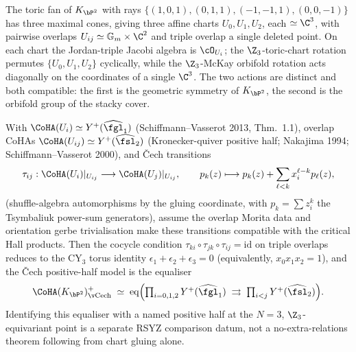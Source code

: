 \begin{theorem}
\label{thm:local-p2-three-chart-cech}
The toric fan of $K_{\bP^2}$ with rays $\{(1,0,1), (0,1,1), (-1,-1,1), (0,0,-1)\}$ has three maximal cones, giving three affine charts $U_0, U_1, U_2$, each $\simeq \C^3$, with pairwise overlaps $U_{ij} \simeq \Gm \times \C^2$ and triple overlap a single deleted point. On each chart the Jordan-triple Jacobi algebra is $\cO_{U_i}$; the $\Z_3$-toric-chart rotation permutes $\{U_0, U_1, U_2\}$ cyclically, while the $\Z_3$-McKay orbifold rotation acts diagonally on the coordinates of a single $\C^3$. The two actions are distinct and both compatible: the first is the geometric symmetry of $K_{\bP^2}$, the second is the orbifold group of the stacky cover.

With $\CoHA(U_i) \simeq Y^+(\widehat{\fgl}_1)$ (Schiffmann--Vasserot 2013, Thm.~1.1), overlap CoHAs $\CoHA(U_{ij}) \simeq Y^+(\widehat{\fsl}_2)$ (Kronecker-quiver positive half; Nakajima 1994; Schiffmann--Vasserot 2000), and \v{C}ech transitions
\[
 \tau_{ij} : \CoHA(U_i)|_{U_{ij}} \longrightarrow \CoHA(U_j)|_{U_{ij}}, \qquad p_k(z) \longmapsto p_k(z) + \sum_{\ell < k} x_i^{\ell - k} p_\ell(z),
\]
(shuffle-algebra automorphisms by the gluing coordinate, with $p_k = \sum z_i^k$ the Tsymbaliuk power-sum generators), assume the overlap Morita data and orientation gerbe trivialisation make these transitions compatible with the critical Hall products. Then the cocycle condition $\tau_{ki} \circ \tau_{jk} \circ \tau_{ij} = \mathrm{id}$ on triple overlaps reduces to the CY$_3$ torus identity $\epsilon_1 + \epsilon_2 + \epsilon_3 = 0$ (equivalently, $x_0 x_1 x_2 = 1$), and the \v{C}ech positive-half model is the equaliser
\[
 \CoHA(K_{\bP^2})^{+}_{\mathrm{\v Cech}}
 \;\simeq\; \mathrm{eq}\Bigl(\textstyle\prod_{i=0,1,2} Y^+(\widehat{\fgl}_1) \;\rightrightarrows\; \prod_{i < j} Y^+(\widehat{\fsl}_2)\Bigr).
\]
Identifying this equaliser with a named positive half at the
$N=3$, $\Z_3$-equivariant point is a separate RSYZ comparison datum,
not a no-extra-relations theorem following from chart gluing alone.
\end{theorem}

